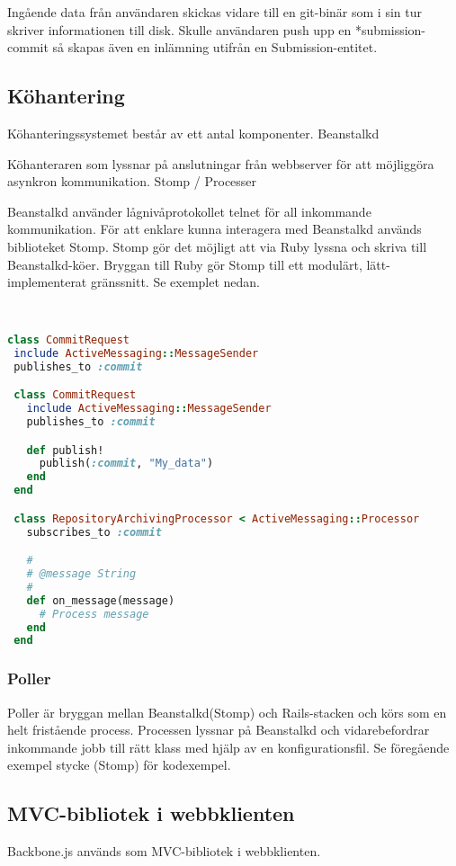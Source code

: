 Ingående data från användaren skickas vidare till en git-binär som i sin tur skriver informationen till disk. Skulle användaren push upp en *submission-commit så skapas även en inlämning utifrån en Submission-entitet.
\subsection{Köhantering}
Köhanteringssystemet består av ett antal komponenter.
Beanstalkd

Köhanteraren som lyssnar på anslutningar från webbserver för att möjliggöra asynkron kommunikation.
Stomp / Processer

Beanstalkd använder lågnivåprotokollet telnet för all inkommande kommunikation. För att enklare kunna interagera med Beanstalkd används biblioteket Stomp. Stomp gör det möjligt att via Ruby lyssna och skriva till Beanstalkd-köer. Bryggan till Ruby gör Stomp till ett modulärt, lätt-implementerat gränssnitt. Se exemplet nedan.

\begin{lstlisting}[language=Ruby]


class CommitRequest
 include ActiveMessaging::MessageSender
 publishes_to :commit

 class CommitRequest
   include ActiveMessaging::MessageSender
   publishes_to :commit

   def publish!
     publish(:commit, "My_data")
   end
 end

 class RepositoryArchivingProcessor < ActiveMessaging::Processor
   subscribes_to :commit

   #
   # @message String
   #
   def on_message(message)
     # Process message
   end
 end
\end{lstlisting}

\subsubsection{Poller}

Poller är bryggan mellan Beanstalkd(Stomp) och Rails-stacken och körs som en helt fristående process. Processen lyssnar på Beanstalkd och vidarebefordrar inkommande jobb till rätt klass med hjälp av en konfigurationsfil. Se föregående exempel stycke (Stomp) för kodexempel.

\subsection{MVC-bibliotek i webbklienten}
Backbone.js används som MVC-bibliotek i webbklienten.


